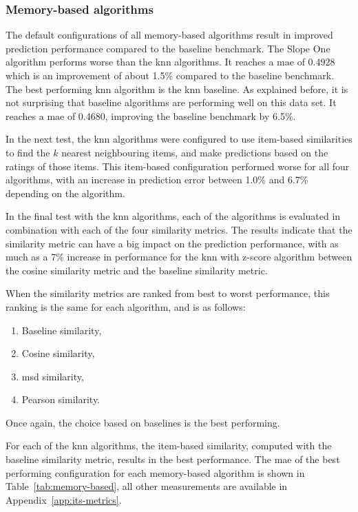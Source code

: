 \subsubsection{Memory-based algorithms}
The default configurations of all memory-based algorithms result in improved prediction performance compared to the baseline benchmark.
The Slope One algorithm performs worse than the \gls{knn} algorithms.
It reaches a \gls{mae} of 0.4928 which is an improvement of about 1.5\% compared to the baseline benchmark.
The best performing \gls{knn} algorithm is the \gls{knn} baseline.
As explained before, it is not surprising that baseline algorithms are performing well on this data set.
It reaches a \gls{mae} of 0.4680, improving the baseline benchmark by 6.5\%.


In the next test, the \gls{knn} algorithms were configured to use item-based similarities to find the $k$ nearest neighbouring items, and make predictions based on the ratings of those items.
This item-based configuration performed worse for all four algorithms, with an increase in prediction error between 1.0\% and 6.7\% depending on the algorithm.

In the final test with the \gls{knn} algorithms, each of the algorithms is evaluated in combination with each of the four similarity metrics.
The results indicate that the similarity metric can have a big impact on the prediction performance, with as much as a 7\% increase in performance for the \gls{knn} with z-score algorithm between the cosine similarity metric and the baseline similarity metric.

When the similarity metrics are ranked from best to worst performance, this ranking is the same for each algorithm, and is as follows:
\begin{enumerate}[noitemsep]
    \item Baseline similarity,
    \item Cosine similarity,
    \item \gls{msd} similarity,
    \item Pearson similarity.
\end{enumerate}

Once again, the choice based on baselines is the best performing.

For each of the \gls{knn} algorithms, the item-based similarity, computed with the baseline similarity metric, results in the best performance.
The \gls{mae} of the best performing configuration for each memory-based algorithm is shown in Table~\ref{tab:memory-based}, all other measurements are available in Appendix~\ref{app:its-metrics}.

